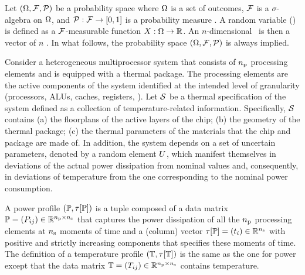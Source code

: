 Let $(\Omega, \mathcal{F}, \mathcal{P})$ be a probability space where $\Omega$ is a set of outcomes, $\mathcal{F}$ is a $\sigma$-algebra on $\Omega$, and $\mathcal{P}: \mathcal{F} \to [0, 1]$ is a probability measure \cite{durrett2010}. A random variable (\rv) is defined as a $\mathcal{F}$-measurable function $X: \Omega \to \mathbb{R}$. An $n$-dimensional \rv\ is then a vector of $n$ \rvs. In what follows, the probability space $(\Omega, \mathcal{F}, \mathcal{P})$ is always implied.

Consider a heterogeneous multiprocessor system that consists of ${n_\text{p}}$ processing elements and is equipped with a thermal package. The processing elements are the active components of the system identified at the intended level of granularity (processors, ALUs, caches, registers, \etc). Let $\mathcal{S}$ be a thermal specification of the system defined as a collection of temperature-related information. Specifically, $\mathcal{S}$ contains (a) the floorplans of the active layers of the chip; (b) the geometry of the thermal package; (c) the thermal parameters of the materials that the chip and package are made of. In addition, the system depends on a set of uncertain parameters, denoted by a random element $U$, which manifest themselves in deviations of the actual power dissipation from nominal values and, consequently, in deviations of temperature from the one corresponding to the nominal power consumption.

A power profile $\profileP$ is a tuple composed of a data matrix $\mathbb{P} = (P_{ij}) \in \mathbb{R}^{{n_\text{p}} \times {n_\text{s}}}$ that captures the power dissipation of all the ${n_\text{p}}$ processing elements at ${n_\text{s}}$ moments of time and a (column) vector $\tau[\mathbb{P}] = (t_i) \in \mathbb{R}^{{n_\text{s}}}$ with positive and strictly increasing components that specifies these moments of time. The definition of a temperature profile $\profileT$ is the same as the one for power except that the data matrix $\mathbb{T} = (T_{ij}) \in \mathbb{R}^{{n_\text{p}} \times {n_\text{s}}}$ contains temperature.

